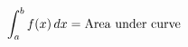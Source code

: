 \documentclass[preview]{standalone}
\begin{document}
\begin{align*}
\special{dvisvgm:raw <g id='unique000'>}\int_a^b f(x)\,dx = \text{Area under curve}\special{dvisvgm:raw </g>}
\end{align*}
\end{document}
